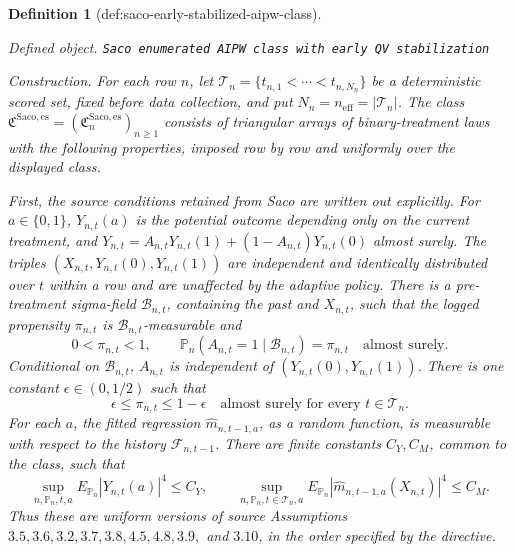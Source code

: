 \documentclass{article}
\newtheorem{definition}{Definition}
\begin{document}
\begin{definition}[def:saco-early-stabilized-aipw-class]\label{def:saco-early-stabilized-aipw-class}
\par\smallskip\noindent\emph{Defined object.} \texttt{Saco enumerated AIPW class with early QV stabilization}
\par\smallskip\noindent\emph{Construction.} For each row \(n\), let \(\mathcal T_n=\{t_{n,1}<\cdots<t_{n,N_n}\}\) be a deterministic scored set, fixed before data collection, and put \(N_n=n_{\mathrm{eff}}=|\mathcal T_n|\).  The class \(\mathfrak C^{\mathrm{Saco,es}}=(\mathfrak C_n^{\mathrm{Saco,es}})_{n\ge1}\) consists of triangular arrays of binary-treatment laws with the following properties, imposed row by row and uniformly over the displayed class.

First, the source conditions retained from Saco are written out explicitly.  For \(a\in\{0,1\}\), \(Y_{n,t}(a)\) is the potential outcome depending only on the current treatment, and \(Y_{n,t}=A_{n,t}Y_{n,t}(1)+(1-A_{n,t})Y_{n,t}(0)\) almost surely.  The triples \((X_{n,t},Y_{n,t}(0),Y_{n,t}(1))\) are independent and identically distributed over \(t\) within a row and are unaffected by the adaptive policy.  There is a pre-treatment sigma-field \(\mathcal B_{n,t}\), containing the past and \(X_{n,t}\), such that the logged propensity \(\pi_{n,t}\) is \(\mathcal B_{n,t}\)-measurable and
\[
0<\pi_{n,t}<1,\qquad
\mathbb P_n(A_{n,t}=1\mid\mathcal B_{n,t})=\pi_{n,t}\quad\text{almost surely}.
\]
Conditional on \(\mathcal B_{n,t}\), \(A_{n,t}\) is independent of \((Y_{n,t}(0),Y_{n,t}(1))\).  There is one constant \(\epsilon\in(0,1/2)\) such that
\[
\epsilon\le\pi_{n,t}\le1-\epsilon
\quad\text{almost surely for every }t\in\mathcal T_n.
\]
For each \(a\), the fitted regression \(\widehat m_{n,t-1,a}\), as a random function, is measurable with respect to the history \(\mathcal F_{n,t-1}\).  There are finite constants \(C_Y,C_M\), common to the class, such that
\[
\sup_{n,\mathbb P_n,t,a}E_{\mathbb P_n}|Y_{n,t}(a)|^4\le C_Y,\qquad
\sup_{n,\mathbb P_n,t\in\mathcal T_n,a}
E_{\mathbb P_n}|\widehat m_{n,t-1,a}(X_{n,t})|^4\le C_M.
\]
Thus these are uniform versions of source Assumptions \(3.5,3.6,3.2,3.7,3.8,4.5,4.8,3.9,\) and \(3.10\), in the order specified by the directive.


\end{definition}
\end{document}
